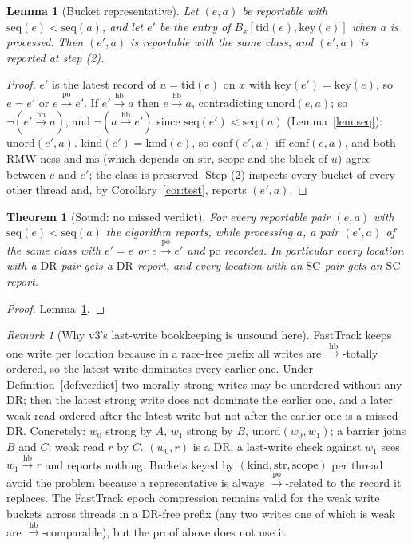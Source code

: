 \documentclass[11pt]{article}
\newtheorem{lemma}{Lemma}
\newtheorem{theorem}{Theorem}
\theoremstyle{remark}
\newtheorem{remark}{Remark}
\newcommand{\PO}{\xrightarrow{\mathrm{po}}}
\newcommand{\HB}{\xrightarrow{\mathrm{hb}}}
\newcommand{\tid}{\mathrm{tid}}
\newcommand{\kind}{\mathrm{kind}}
\newcommand{\str}{\mathrm{str}}
\newcommand{\scope}{\mathrm{scope}}
\newcommand{\ms}{\mathrm{ms}}
\newcommand{\conf}{\mathrm{conf}}
\newcommand{\unord}{\mathrm{unord}}
\newcommand{\DR}{\mathrm{DR}}
\newcommand{\SC}{\mathrm{SC}}
\newcommand{\seq}{\mathrm{seq}}
\newcommand{\bucket}{\mathrm{key}}
\begin{document}
\begin{lemma}[Bucket representative]\label{lem:rep}
Let $(e,a)$ be reportable with $\seq(e)<\seq(a)$, and let $e'$ be the entry
of $B_x[\tid(e),\bucket(e)]$ when $a$ is processed. Then $(e',a)$ is
reportable with the same class, and $(e',a)$ is reported at step (2).
\end{lemma}
\begin{proof}
$e'$ is the latest record of $u=\tid(e)$ on $x$ with $\bucket(e')=\bucket(e)$,
so $e=e'$ or $e\PO e'$. If $e'\HB a$ then $e\HB a$, contradicting $\unord(e,a)$;
so $\neg(e'\HB a)$, and $\neg(a\HB e')$ since $\seq(e')<\seq(a)$
(Lemma~\ref{lem:seq}): $\unord(e',a)$. $\kind(e')=\kind(e)$, so
$\conf(e',a)$ iff $\conf(e,a)$, and both RMW-ness and $\ms$ (which depends on
$\str$, $\scope$ and the block of $u$) agree between $e$ and $e'$; the class
is preserved. Step (2) inspects every bucket of every other thread and, by
Corollary~\ref{cor:test}, reports $(e',a)$.
\end{proof}

\begin{theorem}[Sound: no missed verdict]\label{thm:sound}
For every reportable pair $(e,a)$ with $\seq(e)<\seq(a)$ the algorithm
reports, while processing $a$, a pair $(e',a)$ of the same class with
$e'=e$ or $e\PO e'$ and $\mathrm{pc}$ recorded. In particular every location
with a $\DR$ pair gets a $\DR$ report, and every location with an $\SC$ pair
gets an $\SC$ report.
\end{theorem}
\begin{proof}
Lemma~\ref{lem:rep}.
\end{proof}

\begin{remark}[Why v3's last-write bookkeeping is unsound here]
FastTrack keeps one write per location because in a race-free prefix all
writes are $\HB$-totally ordered, so the latest write dominates every earlier
one. Under Definition~\ref{def:verdict} two morally strong writes may be
unordered without any $\DR$; then the latest strong write does not dominate
the earlier one, and a later weak read ordered after the latest write but not
after the earlier one is a missed $\DR$. Concretely: $w_0$ strong by $A$,
$w_1$ strong by $B$, $\unord(w_0,w_1)$; a barrier joins $B$ and $C$; weak read
$r$ by $C$. $(w_0,r)$ is a $\DR$; a last-write check against $w_1$ sees
$w_1\HB r$ and reports nothing. Buckets keyed by $(\kind,\str,\scope)$ per
thread avoid the problem because a representative is always $\PO$-related to
the record it replaces. The FastTrack epoch compression remains valid for the
weak write buckets across threads in a $\DR$-free prefix (any two writes one
of which is weak are $\HB$-comparable), but the proof above does not use it.
\end{remark}
\end{document}
